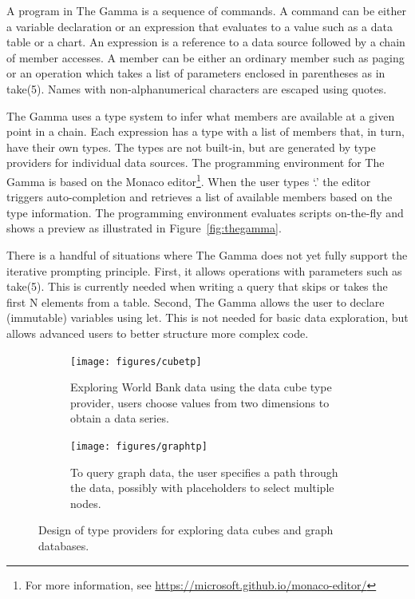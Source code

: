 \documentclass[manuscript,review,anonymous]{acmart}
\newcommand{\ikvd}[1]{{\fontfamily{zi4}\selectfont\small #1}}
\begin{document}
A program in The Gamma is a sequence of commands. A command can be either a variable declaration
or an expression that evaluates to a value such as a data table or a chart.
An expression is a reference to a data source followed by a chain of member accesses.
A member can be either an ordinary member such as \ikvd{paging} or an operation which takes a
list of parameters enclosed in parentheses as in \ikvd{take(5)}.
Names with non-alphanumerical characters are escaped using quotes.

The Gamma uses a type system to infer what members are available at a given point in a chain.
Each expression has a type with a list of members that, in turn, have their own types.
The types are not built-in, but are generated by type providers for individual data sources.
The programming environment for The Gamma is based on the Monaco editor\footnote{For
more information, see \url{https://microsoft.github.io/monaco-editor/}}. When the user types `.'
the editor triggers auto-completion and retrieves a list of available members based on the type
information. The programming environment evaluates scripts on-the-fly and shows a preview as
illustrated in Figure~\ref{fig:thegamma}.

There is a handful of situations where The Gamma does not yet fully support the iterative prompting
principle. First, it allows operations with parameters such as \ikvd{take(5)}. This is currently
needed when writing a query that skips or takes the first N elements from a table. Second,
The Gamma allows the user to declare (immutable) variables using \ikvd{let}. This is not needed
for basic data exploration, but allows advanced users to better structure more complex code.

\begin{figure}
\centering
\begin{subfigure}[b]{0.5\textwidth}
  \centering
  \texttt{[image: figures/cubetp]}
  \vspace{0.5em}
  \caption{Exploring World Bank data using the data cube type provider, users
    choose values from two dimensions to obtain a data series.}
  \label{fig:cubetp}
\end{subfigure}
\hfill
\begin{subfigure}[b]{0.45\textwidth}
  \centering
  \texttt{[image: figures/graphtp]}
  \caption{To query graph data, the user specifies a path through the data, possibly with
    placeholders to select multiple nodes.}
  \label{fig:graphtp}
\end{subfigure}
\vspace{-0.5em}
\caption{Design of type providers for exploring data cubes and graph databases.}
\label{fig:tps}
\end{figure}
\end{document}
